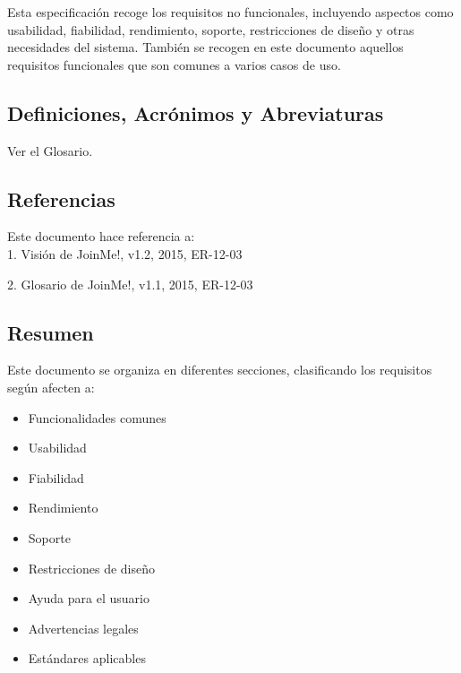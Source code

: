 \documentclass[12pt, a4paper, titlepage]{article}
\begin{document}
Esta especificación recoge los requisitos no funcionales, incluyendo aspectos como usabilidad, fiabilidad, rendimiento, soporte, restricciones de diseño y otras necesidades del sistema. También se recogen en este documento aquellos requisitos funcionales que son comunes a varios casos de uso.

\subsection{Definiciones, Acrónimos y Abreviaturas}

Ver el Glosario.

\subsection{Referencias}

Este documento hace referencia a:\\

1. Visión de JoinMe!, v1.2, 2015, ER-12-03

2. Glosario de JoinMe!, v1.1, 2015, ER-12-03

\subsection{Resumen}

Este documento se organiza en diferentes secciones, clasificando los requisitos según afecten a:

\begin{itemize}
	\item Funcionalidades comunes
	\item Usabilidad
	\item Fiabilidad
	\item Rendimiento
	\item Soporte
	\item Restricciones de diseño
	\item Ayuda para el usuario
	\item Advertencias legales
	\item Estándares aplicables
\end{itemize}
\end{document}
